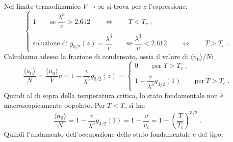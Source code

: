 \documentclass[10pt,a4paper]{report}
\theoremstyle{definition}
\numberwithin{equation}{section}
\newcommand{\bra}{\langle}
\newcommand{\ket}{\rangle}
\begin{document}
Nel limite termodinamico $V\to\infty$ si trova per $z$ l'espressione:
\begin{equation}
\begin{cases}
1\qquad \mbox{se}\; \dfrac{\lambda^3}{v}>2.612\qquad\Longleftrightarrow\qquad T<T_c\;, \\
\\
\mbox{soluzione di}\; g_{3/2}(z)=\dfrac{\lambda^3}{v}\qquad \mbox{se}\;\dfrac{\lambda^3}{v}<2.612\qquad \Longleftrightarrow \qquad T>T_c\;.
\end{cases}
\end{equation}
Calcoliamo adesso la frazione di condensato, ossia il valore di $\bra n_0\ket/N$:
\begin{equation}
\frac{\bra n_0\ket}{N}=\frac{\bra n_0\ket}{V}v=1-\frac{v}{\lambda^3}g_{3/2}(z)=\begin{cases}
0\qquad \mbox{per}\; T>T_c\;, \\
\\
1-\dfrac{v}{\lambda^3}g_{3/2}(1)\qquad\mbox{per}\; T>T_c\;.
\end{cases}
\end{equation}
Quindi al di sopra della temperatura critica, lo stato fondamentale non è macroscopicamente popolato. Per $T<T_c$ si ha:
\begin{equation}
\frac{\bra n_0\ket}{N}=1-\frac{v}{\lambda^3}g_{3/2}(1)=1-\frac{v}{v_c}=1-\left(\frac{T}{T_c}\right)^{3/2}\;.
\end{equation}
Quindi l'andamento dell'occupazione dello stato fondamentale è del tipo:
\end{document}
